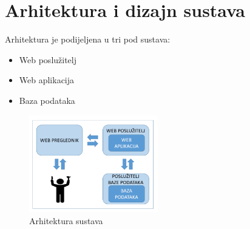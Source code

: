 \chapter{Arhitektura i dizajn sustava}		
Arhitektura je podijeljena u tri pod sustava:

\begin{itemize}
	\item Web poslužitelj
	\item Web aplikacija
	\item Baza podataka	
\end{itemize}

\begin{figure}
	\centering
	\includegraphics[width=0.5\textwidth]{Slike/ArhitekturaSustava}
	\caption{Arhitektura sustava}
	\label{fig:example}
\end{figure}

